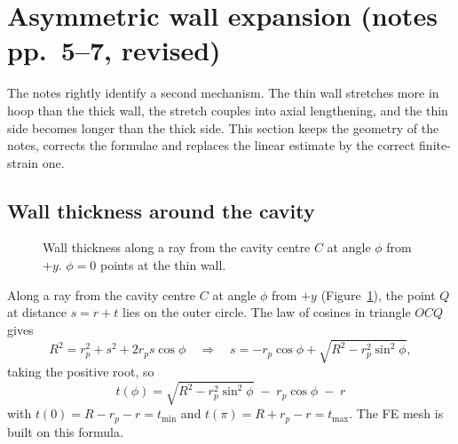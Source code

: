 \documentclass[11pt,a4paper]{article}
\numberwithin{equation}{section}
\newcommand{\rp}{r_p}
\newcommand{\tmin}{t_{\min}}
\newcommand{\tmax}{t_{\max}}
\begin{document}
\section{Asymmetric wall expansion (notes pp.~5--7, revised)}\label{sec:wall}

The notes rightly identify a second mechanism. The thin wall stretches more in hoop than the thick wall, the
stretch couples into axial lengthening, and the thin side becomes longer than the thick side. This section keeps the geometry of
the notes, corrects the formulae and replaces the linear estimate by the correct finite-strain one.

\subsection{Wall thickness around the cavity}
\begin{figure}[H]
\centering
{}
\caption{Wall thickness along a ray from the cavity centre $C$ at angle $\phi$ from $+y$. $\phi=0$ points at the thin wall.}
\label{fig:tphi}
\end{figure}
Along a ray from the cavity centre $C$ at angle $\phi$ from $+y$ (Figure~\ref{fig:tphi}), the point $Q$ at distance $s=r+t$ lies on the outer circle.
The law of cosines in triangle $OCQ$ gives
\begin{equation}
R^2 = \rp^2 + s^2 + 2\rp s\cos\phi
\quad\Longrightarrow\quad
s = -\rp\cos\phi + \sqrt{R^2-\rp^2\sin^2\phi},
\end{equation}
taking the positive root, so
\begin{equation}
\boxed{\;t(\phi) = \sqrt{R^2-\rp^2\sin^2\phi} \;-\; \rp\cos\phi \;-\; r\;} \label{eq:tphi}
\end{equation}
with $t(0) = R-\rp-r = \tmin$ and $t(\pi) = R+\rp-r = \tmax$. The FE mesh is built on this formula.
\end{document}
